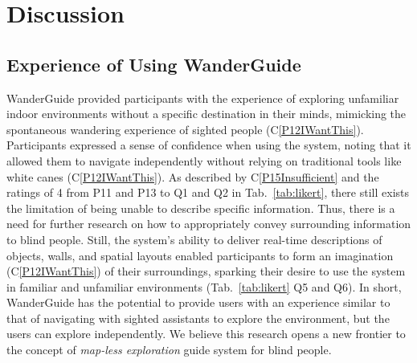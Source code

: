 \section{Discussion}
\subsection{Experience of Using WanderGuide}
WanderGuide provided participants with the experience of exploring unfamiliar indoor environments without a specific destination in their minds, mimicking the spontaneous wandering experience of sighted people (C\ref{P12IWantThis}). 
Participants expressed a sense of confidence when using the system, noting that it allowed them to navigate independently without relying on traditional tools like white canes (C\ref{P12IWantThis}). 
As described by C\ref{P15Insufficient} and the ratings of 4 from P11 and P13 to Q1 and Q2 in Tab.~\ref{tab:likert}, there still exists the limitation of being unable to describe specific information.
Thus, there is a need for further research on how to appropriately convey surrounding information to blind people.
Still, the system’s ability to deliver real-time descriptions of objects, walls, and spatial layouts enabled participants to form an imagination (C\ref{P12IWantThis}) of their surroundings, sparking their desire to use the system in familiar and unfamiliar environments (Tab.~\ref{tab:likert} Q5 and Q6).
In short, WanderGuide has the potential to provide users with an experience similar to that of navigating with sighted assistants to explore the environment, but the users can explore independently.
We believe this research opens a new frontier to the concept of \textit{map-less exploration} guide system for blind people.

